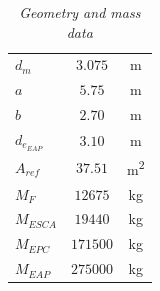 \documentclass[12pt,fleqn,openany]{book} %
\begin{document}
\begin{table}[h]
\begin{tabular}{ l c c}
		$d_m  		$							&$3.075 $          &\si{\meter}        \\
		$a$										&$5.75$            &\si{\meter}        \\
		$b$                                     &$2.70$            &\si{\meter}        \\
		$d_{e_{EAP}}$ 								&$3.10$     	   &\si{\meter}        \\
		$A_{ref}$								&$37.51$		   &\si{\meter\squared}\\
		$M_F  		$							&$12675 $          &\si{\kilogram}     \\
		$M_{ESCA } 	$							&$19440 $          &\si{\kilogram}     \\
		$M_{EPC  }	$								&$171500$      &\si{\kilogram}     \\
		$M_{EAP  }	$								&$275000$      &\si{\kilogram}     \\
		\bottomrule
	\end{tabular} 
	\caption{\emph{Geometry and mass data}}
	\label{tab:gmdata}
\end{table}
\end{document}
